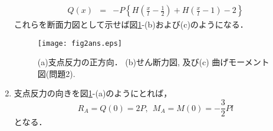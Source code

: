 \documentclass[10pt,a4j]{jarticle}
\begin{document}
\begin{enumerate}
\begin{eqnarray}
	Q(x) &=&
		-P
		\left\{
				H\left(\frac{x}{l} -\frac{1}{2}\right)
				+
				H\left(\frac{x}{l} -1 \right)
				-
				2
		\right\}
	\label{eqn:Q2}
\end{eqnarray}
これらを断面力図として示せば図\ref{fig:fig2}-(b)および(c)のようになる．
\begin{figure}[h]
	\begin{center}
	\texttt{[image: fig2ans.eps]} 
	\end{center}
	\vspace{-5mm}
	\caption{(a)支点反力の正方向．
	(b)せん断力図, 及び(c) 曲げモーメント図(問題2).}
	\label{fig:fig2}
\end{figure}
\item
支点反力の向きを図\ref{fig:fig2}-(a)のようにとれば，
\begin{equation}
	R_A = Q(0) =  2P, \ \  
	M_A = M(0) =  -\frac{3}{2}Pl
\end{equation}
となる．
\end{enumerate}
\end{document}
